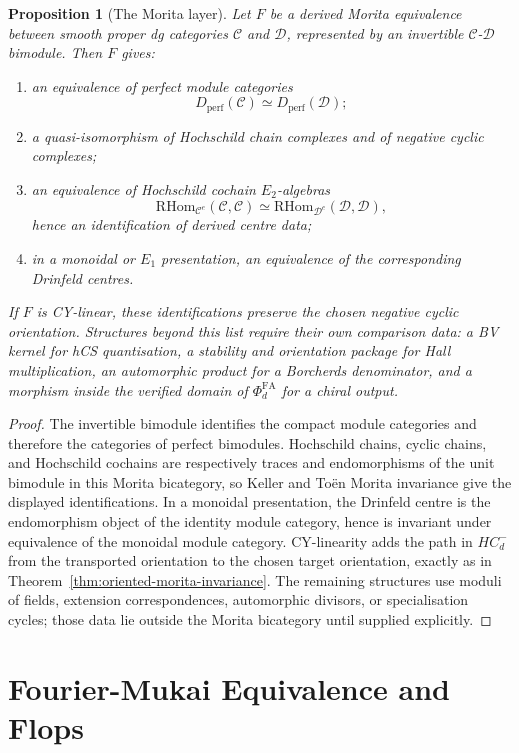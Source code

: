 \documentclass[11pt]{amsart}
\newtheorem{proposition}[theorem]{Proposition}
\newcommand{\Dperf}{D_{\mathrm{perf}}}
\newcommand{\cC}{\mathcal{C}}
\newcommand{\cD}{\mathcal{D}}
\newcommand{\PhiFA}{\Phi^{\mathrm{FA}}}
\begin{document}
\begin{proposition}[The Morita layer]
\label{prop:morita-layer}
Let $F$ be a derived Morita equivalence between smooth proper dg
categories $\cC$ and $\cD$, represented by an invertible
$\cC$-$\cD$ bimodule.  Then $F$ gives:
\begin{enumerate}
\item an equivalence of perfect module categories
\[
  \Dperf(\cC)\simeq\Dperf(\cD);
\]
\item a quasi-isomorphism of Hochschild chain complexes and of negative
cyclic complexes;
\item an equivalence of Hochschild cochain $E_2$-algebras
\[
  \mathrm{RHom}_{\cC^e}(\cC,\cC)
  \simeq
  \mathrm{RHom}_{\cD^e}(\cD,\cD),
\]
hence an identification of derived centre data;
\item in a monoidal or $E_1$ presentation, an equivalence of the
corresponding Drinfeld centres.
\end{enumerate}
If $F$ is CY-linear, these identifications preserve the chosen negative
cyclic orientation.  Structures beyond this list require their own
comparison data: a BV kernel for hCS quantisation, a stability and
orientation package for Hall multiplication, an automorphic product for
a Borcherds denominator, and a morphism inside the verified domain of
$\PhiFA_d$ for a chiral output.
\end{proposition}

\begin{proof}
The invertible bimodule identifies the compact module categories and
therefore the categories of perfect bimodules.  Hochschild chains,
cyclic chains, and Hochschild cochains are respectively traces and
endomorphisms of the unit bimodule in this Morita bicategory, so Keller
and To\"en Morita invariance give the displayed identifications.  In a
monoidal presentation, the Drinfeld centre is the endomorphism object of
the identity module category, hence is invariant under equivalence of
the monoidal module category.  CY-linearity adds the path in $HC^-_d$
from the transported orientation to the chosen target orientation,
exactly as in Theorem~\ref{thm:oriented-morita-invariance}.  The
remaining structures use moduli of fields, extension correspondences,
automorphic divisors, or specialisation cycles; those data lie outside
the Morita bicategory until supplied explicitly.
\end{proof}

\section{Fourier-Mukai Equivalence and Flops}
\end{document}
